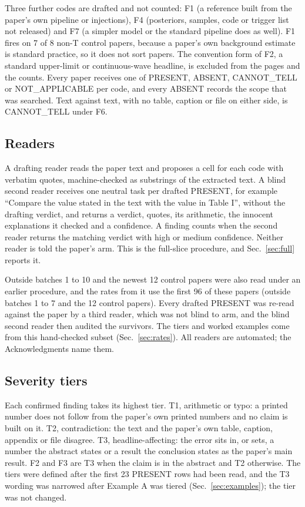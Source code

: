 \documentclass[reprint,amsmath,amssymb,aps,superscriptaddress,nofootinbib]{revtex4-2}
\begin{document}
Three further codes are drafted and not counted: F1 (a reference built from the paper's own pipeline or injections), F4 (posteriors, samples, code or trigger list not released) and F7 (a simpler model or the standard pipeline does as well). F1 fires on 7 of 8 non-T control papers, because a paper's own background estimate is standard practice, so it does not sort papers. The convention form of F2, a standard upper-limit or continuous-wave headline, is excluded from the pages and the counts. Every paper receives one of PRESENT, ABSENT, CANNOT\_TELL or NOT\_APPLICABLE per code, and every ABSENT records the scope that was searched. Text against text, with no table, caption or file on either side, is CANNOT\_TELL under F6.

\subsection{Readers}

A drafting reader reads the paper text and proposes a cell for each code with verbatim quotes, machine-checked as substrings of the extracted text. A blind second reader receives one neutral task per drafted PRESENT, for example ``Compare the value stated in the text with the value in Table I'', without the drafting verdict, and returns a verdict, quotes, its arithmetic, the innocent explanations it checked and a confidence. A finding counts when the second reader returns the matching verdict with high or medium confidence. Neither reader is told the paper's arm. This is the full-slice procedure, and Sec.~\ref{sec:full} reports it.

Outside batches 1 to 10 and the newest 12 control papers were also read under an earlier procedure, and the rates from it use the first 96 of these papers (outside batches 1 to 7 and the 12 control papers). Every drafted PRESENT was re-read against the paper by a third reader, which was not blind to arm, and the blind second reader then audited the survivors. The tiers and worked examples come from this hand-checked subset (Sec.~\ref{sec:rates}). All readers are automated; the Acknowledgments name them.

\subsection{Severity tiers}

Each confirmed finding takes its highest tier. T1, arithmetic or typo: a printed number does not follow from the paper's own printed numbers and no claim is built on it. T2, contradiction: the text and the paper's own table, caption, appendix or file disagree. T3, headline-affecting: the error sits in, or sets, a number the abstract states or a result the conclusion states as the paper's main result. F2 and F3 are T3 when the claim is in the abstract and T2 otherwise. The tiers were defined after the first 23 PRESENT rows had been read, and the T3 wording was narrowed after Example A was tiered (Sec.~\ref{sec:examples}); the tier was not changed.
\end{document}
